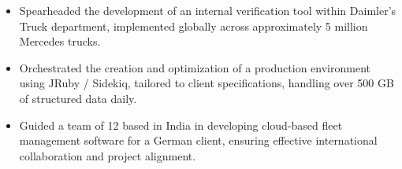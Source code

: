 \begin{itemize}
  \item Spearheaded the development of an internal verification tool within Daimler's Truck department, implemented globally across approximately 5 million Mercedes trucks.
  \item Orchestrated the creation and optimization of a production environment using JRuby / Sidekiq, tailored to client specifications, handling over 500 GB of structured data daily.
  \item Guided a team of 12 based in India in developing cloud-based fleet management software for a German client, ensuring effective international collaboration and project alignment.
\end{itemize}
\divider
